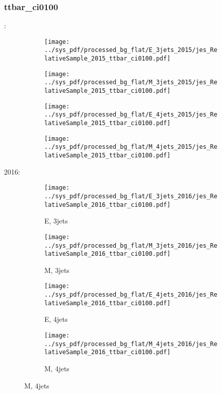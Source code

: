 \documentclass{beamer}
\begin{document}
\begin{frame}
\frametitle{ttbar_ci0100}
\fontsize{5}{1}:
\begin{figure}
\centering
\begin{subfigure}[b]{0.24\textwidth}
\texttt{[image: ../sys\_pdf/processed\_bg\_flat/E\_3jets\_2015/jes\_RelativeSample\_2015\_ttbar\_ci0100.pdf]}
\end{subfigure}
\begin{subfigure}[b]{0.24\textwidth}
\texttt{[image: ../sys\_pdf/processed\_bg\_flat/M\_3jets\_2015/jes\_RelativeSample\_2015\_ttbar\_ci0100.pdf]}
\end{subfigure}
\begin{subfigure}[b]{0.24\textwidth}
\texttt{[image: ../sys\_pdf/processed\_bg\_flat/E\_4jets\_2015/jes\_RelativeSample\_2015\_ttbar\_ci0100.pdf]}
\end{subfigure}
\begin{subfigure}[b]{0.24\textwidth}
\texttt{[image: ../sys\_pdf/processed\_bg\_flat/M\_4jets\_2015/jes\_RelativeSample\_2015\_ttbar\_ci0100.pdf]}
\end{subfigure}
\end{figure}
2016:
\begin{figure}
\centering
\begin{subfigure}[b]{0.24\textwidth}
\texttt{[image: ../sys\_pdf/processed\_bg\_flat/E\_3jets\_2016/jes\_RelativeSample\_2016\_ttbar\_ci0100.pdf]}
\captionsetup{font=tiny}
\caption{E, 3jets}
\end{subfigure}
\begin{subfigure}[b]{0.24\textwidth}
\texttt{[image: ../sys\_pdf/processed\_bg\_flat/M\_3jets\_2016/jes\_RelativeSample\_2016\_ttbar\_ci0100.pdf]}
\captionsetup{font=tiny}
\caption{M, 3jets}
\end{subfigure}
\begin{subfigure}[b]{0.24\textwidth}
\texttt{[image: ../sys\_pdf/processed\_bg\_flat/E\_4jets\_2016/jes\_RelativeSample\_2016\_ttbar\_ci0100.pdf]}
\captionsetup{font=tiny}
\caption{E, 4jets}
\end{subfigure}
\begin{subfigure}[b]{0.24\textwidth}
\texttt{[image: ../sys\_pdf/processed\_bg\_flat/M\_4jets\_2016/jes\_RelativeSample\_2016\_ttbar\_ci0100.pdf]}
\captionsetup{font=tiny}
\caption{M, 4jets}
\end{subfigure}
\end{figure}
\end{frame}
\end{document}
